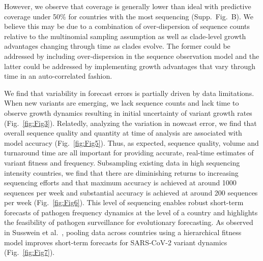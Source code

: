 \documentclass[10pt,letterpaper]{article}
\begin{document}
However, we observe that coverage is generally lower than ideal with predictive coverage under 50\% for countries with the most sequencing (Supp.\ Fig.\ B).
We believe this may be due to a combination of over-dispersion of sequence counts relative to the multinomial sampling assumption as well as clade-level growth advantages changing through time as clades evolve.
The former could be addressed by including over-dispersion in the sequence observation model and the latter could be addressed by implementing growth advantages that vary through time in an auto-correlated fashion.


We find that variability in forecast errors is partially driven by data limitations.
When new variants are emerging, we lack sequence counts and lack time to observe growth dynamics resulting in initial uncertainty of variant growth rates (Fig.~\ref{fig:Fig3}).
Relatedly, analyzing the variation in nowcast error, we find that overall sequence quality and quantity at time of analysis are associated with model accuracy (Fig.~\ref{fig:Fig5}).
Thus, as expected, sequence quality, volume and turnaround time are all important for providing accurate, real-time estimates of variant fitness and frequency.
Subsampling existing data in high sequencing intensity countries, we find that there are diminishing returns to increasing sequencing efforts and that maximum accuracy is achieved at around 1000 sequences per week and substantial accuracy is achieved at around 200 sequences per week (Fig.~\ref{fig:Fig6}).
This level of sequencing enables robust short-term forecasts of pathogen frequency dynamics at the level of a country and highlights the feasibility of pathogen surveillance for evolutionary forecasting.
As observed in Susswein et al.\ \cite{susswein2023leveraging}, pooling data across countries using a hierarchical fitness model improves short-term forecasts for SARS-CoV-2 variant dynamics (Fig.~\ref{fig:Fig7}).
\end{document}
